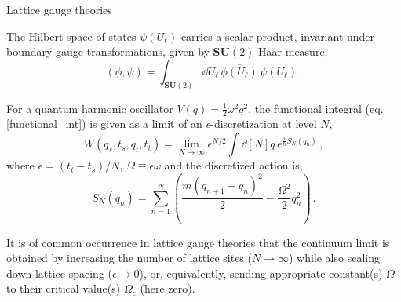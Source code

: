 \documentclass[12pt,titlepage]{article}
\begin{document}
\begin{frame}{Lattice gauge theories}
    \begin{list}{\,}{\leftmargin=1em \itemindent=0em}
        \item<1-> The Hilbert space of states $\psi(U_\ell)$ carries a scalar product, invariant under boundary gauge transformations, given by $\mathbf{SU}(2)$ Haar measure,
        \begin{equation}
            (\phi,\psi)=\int_{\mathbf{SU}(2)}\dd{U_\ell}\,\overline{\phi(U_\ell)}\,\psi(U_\ell)\,.
        \end{equation}
        \item<2-> For a quantum harmonic oscillator $V(q)=\frac{1}{2}\omega^2 q^2$, the functional integral (eq. \ref{functional_int}) is given as a limit of an $\epsilon$-discretization at level $N$,
        \begin{equation}
            W(q_s,t_s,q_t,t_t)=\lim_{N\to\infty}\epsilon^{N/2}\int\dd[N]{q}\,e^{\frac{i}{\hbar}S_N(q_n)}\,,
        \end{equation}
        where $\epsilon=(t_t-t_s)/N$, $\Omega\equiv\epsilon\omega$ and the discretized action is, 
        \begin{equation}
            S_N(q_n)=\sum_{n=1}^N\left(\frac{m(q_{n+1}-q_n)^2}{2}-\frac{\Omega^2}{2}q_n^2\right)\,.
        \end{equation}
        \item<3-> It is of common occurrence in lattice gauge theories that the continuum limit is obtained by increasing the number of lattice sites ($N\to\infty$) while also scaling down lattice spacing ($\epsilon\to 0$), or, equivalently, sending appropriate constant(s) $\Omega$ to their critical value(s) $\Omega_\text{c}$ (here zero).
    \end{list}
\end{frame}
\end{document}
